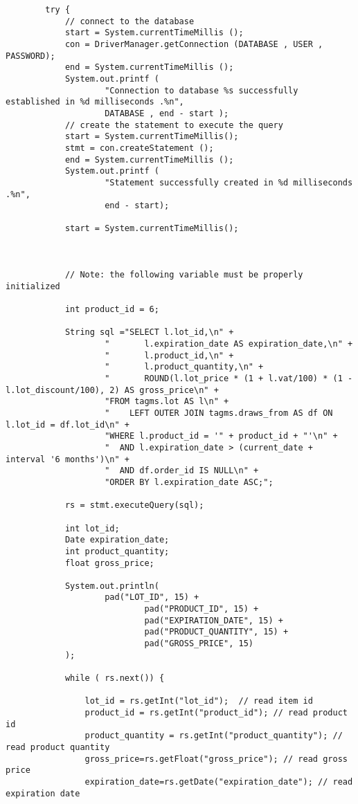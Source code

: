 \begin{lstlisting}
        try {
            // connect to the database
            start = System.currentTimeMillis ();
            con = DriverManager.getConnection (DATABASE , USER , PASSWORD);
            end = System.currentTimeMillis ();
            System.out.printf (
                    "Connection to database %s successfully established in %d milliseconds .%n",
                    DATABASE , end - start );
            // create the statement to execute the query
            start = System.currentTimeMillis();
            stmt = con.createStatement ();
            end = System.currentTimeMillis ();
            System.out.printf (
                    "Statement successfully created in %d milliseconds .%n",
                    end - start);

            start = System.currentTimeMillis();



            // Note: the following variable must be properly initialized

            int product_id = 6;

            String sql ="SELECT l.lot_id,\n" +
                    "       l.expiration_date AS expiration_date,\n" +
                    "       l.product_id,\n" +
                    "       l.product_quantity,\n" +
                    "       ROUND(l.lot_price * (1 + l.vat/100) * (1 - l.lot_discount/100), 2) AS gross_price\n" +
                    "FROM tagms.lot AS l\n" +
                    "    LEFT OUTER JOIN tagms.draws_from AS df ON l.lot_id = df.lot_id\n" +
                    "WHERE l.product_id = '" + product_id + "'\n" +
                    "  AND l.expiration_date > (current_date + interval '6 months')\n" +
                    "  AND df.order_id IS NULL\n" +
                    "ORDER BY l.expiration_date ASC;";

            rs = stmt.executeQuery(sql);

            int lot_id;
            Date expiration_date;
            int product_quantity;
            float gross_price;

            System.out.println(
                    pad("LOT_ID", 15) +
                            pad("PRODUCT_ID", 15) +
                            pad("EXPIRATION_DATE", 15) +
                            pad("PRODUCT_QUANTITY", 15) +
                            pad("GROSS_PRICE", 15)
            );

            while ( rs.next()) {

                lot_id = rs.getInt("lot_id");  // read item id
                product_id = rs.getInt("product_id"); // read product id
                product_quantity = rs.getInt("product_quantity"); // read product quantity
                gross_price=rs.getFloat("gross_price"); // read gross price
                expiration_date=rs.getDate("expiration_date"); // read expiration date


\end{lstlisting}
